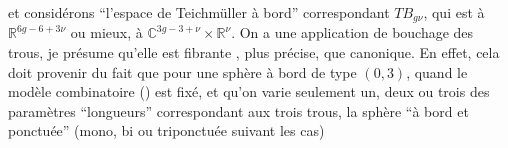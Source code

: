 et considérons ``l'espace de
Teichmüller à bord'' correspondant
 $TB_{g\nu}$, qui est  à $\mathbb R^{6g-6+3\nu}$
ou mieux, à $\mathbb C^{3g-3+\nu}\times\mathbb R^\nu$. On a une
application
de bouchage des trous, je présume
qu'elle est fibrante ,
plus précise, que 
canonique.  En effet, cela doit
provenir du fait que pour une
sphère à bord  de type $(0,3)$, 
quand le modèle combinatoire
() est fixé, et
qu'on varie seulement  un, deux
ou trois des paramètres ``longueurs''
correspondant aux trois trous, la
sphère ``à bord et ponctuée'' (mono, bi ou
triponctuée suivant les cas) 

